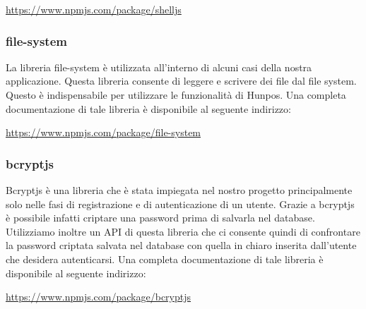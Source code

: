\begin{center}
	\url{https://www.npmjs.com/package/shelljs}
\end{center}
\subsubsection{file-system}
La libreria file-system è utilizzata all'interno di alcuni casi della nostra applicazione. Questa libreria consente di leggere e scrivere dei file dal file system. Questo è indispensabile per utilizzare le funzionalità di Hunpos.
Una completa documentazione di tale libreria è disponibile al seguente indirizzo:

\begin{center}
	\url{https://www.npmjs.com/package/file-system}
\end{center}
\subsubsection{bcryptjs}
Bcryptjs è una libreria che è stata impiegata nel nostro progetto principalmente solo nelle fasi di registrazione e di autenticazione di un utente. Grazie a bcryptjs è possibile infatti criptare una password prima di salvarla nel database. Utilizziamo inoltre un API di questa libreria che ci consente quindi di confrontare la password criptata salvata nel database con quella in chiaro inserita dall'utente che desidera autenticarsi.
Una completa documentazione di tale libreria è disponibile al seguente indirizzo:

\begin{center}
	\url{https://www.npmjs.com/package/bcryptjs}
\end{center}